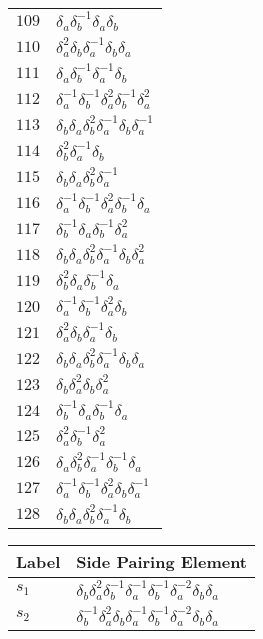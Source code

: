 \documentclass{article}
\begin{document}
\begin{center}
\begin{tabular}{ll}
$109$ & $\delta_a^{}\delta_b^{-1}\delta_a^{}\delta_b^{}$ \\
$110$ & $\delta_a^{2}\delta_b^{}\delta_a^{-1}\delta_b^{}\delta_a^{}$ \\
$111$ & $\delta_a^{}\delta_b^{-1}\delta_a^{-1}\delta_b^{}$ \\
$112$ & $\delta_a^{-1}\delta_b^{-1}\delta_a^{2}\delta_b^{-1}\delta_a^{2}$ \\
$113$ & $\delta_b^{}\delta_a^{}\delta_b^{2}\delta_a^{-1}\delta_b^{}\delta_a^{-1}$ \\
$114$ & $\delta_b^{2}\delta_a^{-1}\delta_b^{}$ \\
$115$ & $\delta_b^{}\delta_a^{}\delta_b^{2}\delta_a^{-1}$ \\
$116$ & $\delta_a^{-1}\delta_b^{-1}\delta_a^{2}\delta_b^{-1}\delta_a^{}$ \\
$117$ & $\delta_b^{-1}\delta_a^{}\delta_b^{-1}\delta_a^{2}$ \\
$118$ & $\delta_b^{}\delta_a^{}\delta_b^{2}\delta_a^{-1}\delta_b^{}\delta_a^{2}$ \\
$119$ & $\delta_b^{2}\delta_a^{}\delta_b^{-1}\delta_a^{}$ \\
$120$ & $\delta_a^{-1}\delta_b^{-1}\delta_a^{2}\delta_b^{}$ \\
$121$ & $\delta_a^{2}\delta_b^{}\delta_a^{-1}\delta_b^{}$ \\
$122$ & $\delta_b^{}\delta_a^{}\delta_b^{2}\delta_a^{-1}\delta_b^{}\delta_a^{}$ \\
$123$ & $\delta_b^{}\delta_a^{2}\delta_b^{}\delta_a^{2}$ \\
$124$ & $\delta_b^{-1}\delta_a^{}\delta_b^{-1}\delta_a^{}$ \\
$125$ & $\delta_a^{2}\delta_b^{-1}\delta_a^{2}$ \\
$126$ & $\delta_a^{}\delta_b^{2}\delta_a^{-1}\delta_b^{-1}\delta_a^{}$ \\
$127$ & $\delta_a^{-1}\delta_b^{-1}\delta_a^{2}\delta_b^{}\delta_a^{-1}$ \\
$128$ & $\delta_b^{}\delta_a^{}\delta_b^{2}\delta_a^{-1}\delta_b^{}$ \\
\bottomrule
\end{tabular}
\hfill
\begin{tabular}{ll}
\toprule
Label & Side Pairing Element\\
\midrule
$s_{1}$ & $\delta_b^{}\delta_a^{2}\delta_b^{-1}\delta_a^{-1}\delta_b^{-1}\delta_a^{-2}\delta_b^{}\delta_a^{}$ \\
$s_{2}$ & $\delta_b^{-1}\delta_a^{2}\delta_b^{}\delta_a^{-1}\delta_b^{-1}\delta_a^{-2}\delta_b^{}\delta_a^{}$ \\

\end{tabular}
\end{center}
\end{document}
